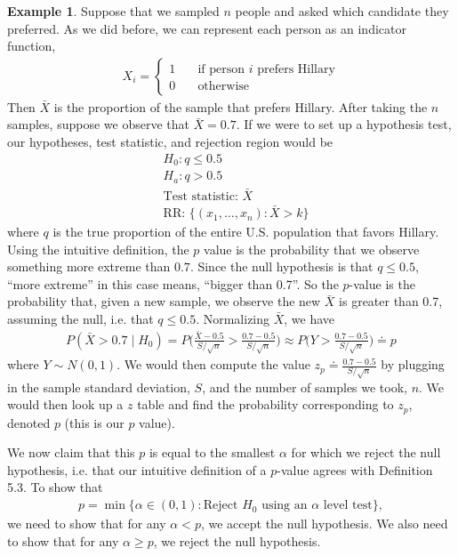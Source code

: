 \documentclass{tufte-book}
\theoremstyle{definition}
\numberwithin{theorem}{section}
\numberwithin{definition}{section}
\numberwithin{lemma}{section}
\numberwithin{corollary}{section}
\numberwithin{proposition}{section}
\numberwithin{remark}{section}
\numberwithin{claim}{section}
\numberwithin{observation}{section}
\numberwithin{fact}{section}
\numberwithin{assumption}{section}
\newtheorem{example}[theorem]{Example}
\numberwithin{example}{section}
\numberwithin{exercise}{section}
\begin{document}
\begin{example}
Suppose that we sampled $n$ people and asked which candidate they preferred. As we did before, we can represent each person as an indicator function, 
\begin{align*}
X_i = \begin{cases}
1 \hspace{1em} &\text{if person $i$ prefers Hillary} \\
0 &\text{otherwise}
\end{cases}
\end{align*}
Then $\bar{X}$ is the proportion of the sample that prefers Hillary. After taking the $n$ samples, suppose we observe that $\bar{X} = 0.7$. If we were to set up a hypothesis test, our hypotheses, test statistic, and rejection region would be
\begin{align*}
&H_0: q \leq 0.5 \\
&H_a: q > 0.5 \\
&\text{Test statistic: } \bar{X} \\
&\text{RR: } \{(x_1,\dots,x_n) : \bar{X} > k\}
\end{align*}
where $q$ is the true proportion of the entire U.S. population that favors Hillary. Using the intuitive definition, the $p$ value is the probability that we observe something more extreme than $0.7$. Since the null hypothesis is that $q \leq 0.5$, ``more extreme'' in this case means, ``bigger than 0.7''. So the $p$-value is the probability that, given a new sample, we observe the new $\bar{X}$ is greater than 0.7, assuming the null, i.e. that $q \leq 0.5$. Normalizing $\bar{X}$, we have
\begin{align}
P(\bar{X} > 0.7 \mid H_0) = P\Big(\frac{\bar{X} - 0.5}{S/\sqrt{n}} > \frac{0.7 - 0.5}{S/\sqrt{n}}\Big) \approx P\Big(Y > \frac{0.7 - 0.5}{S/\sqrt{n}} \Big) \doteq p
\end{align}
where $Y \sim N(0,1)$. We would then compute the value $z_p \doteq\frac{0.7 - 0.5}{S/\sqrt{n}}$ by plugging in the sample standard deviation, $S$, and the number of samples we took, $n$. We would then look up a $z$ table and find the probability corresponding to $z_{p}$, denoted $p$ (this is our $p$ value).

We now claim that this $p$ is equal to the smallest $\alpha$ for which we reject the null hypothesis, i.e. that our intuitive definition of a $p$-value agrees with Definition 5.3. To show that 
\begin{align*}
p = \min \{\alpha \in (0,1): \text{Reject $H_0$ using an $\alpha$ level test}\},
\end{align*}
we need to show that for any $\alpha < p$, we accept the null hypothesis. We also need to show that for any $\alpha \geq p$, we reject the null hypothesis.


\end{example}
\end{document}
